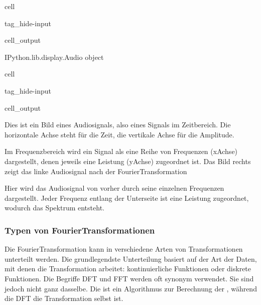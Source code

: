 \documentclass[letterpaper,10pt,english]{jupyterBook}
\begin{document}
\begin{sphinxuseclass}{cell}
\begin{sphinxuseclass}{tag_hide-input}\begin{sphinxVerbatimOutput}

\begin{sphinxuseclass}{cell_output}
\begin{sphinxVerbatim}[commandchars=\\\{\}]
\PYGZlt{}IPython.lib.display.Audio object\PYGZgt{}
\end{sphinxVerbatim}

\end{sphinxuseclass}\end{sphinxVerbatimOutput}

\end{sphinxuseclass}
\end{sphinxuseclass}
\begin{sphinxuseclass}{cell}
\begin{sphinxuseclass}{tag_hide-input}\begin{sphinxVerbatimOutput}

\begin{sphinxuseclass}{cell_output}
\noindent{}

\end{sphinxuseclass}\end{sphinxVerbatimOutput}

\end{sphinxuseclass}
\end{sphinxuseclass}
\sphinxAtStartPar
Dies ist ein Bild eines Audiosignals, also eines Signals im Zeitbereich. Die horizontale Achse steht für die Zeit, die vertikale Achse für die Amplitude.

\sphinxAtStartPar
Im Frequenzbereich wird ein Signal als eine Reihe von Frequenzen (x\sphinxhyphen{}Achse) dargestellt, denen jeweils eine Leistung (y\sphinxhyphen{}Achse) zugeordnet ist. Das Bild rechts zeigt das linke Audiosignal nach der Fourier\sphinxhyphen{}Transformation

\sphinxAtStartPar
Hier wird das Audiosignal von vorher durch seine einzelnen Frequenzen dargestellt. Jeder Frequenz entlang der Unterseite ist eine Leistung zugeordnet, wodurch das Spektrum entsteht.


\subsubsection{Typen von Fourier\sphinxhyphen{}Transformationen}
\label{\detokenize{content/3_FourierAnalyse:typen-von-fourier-transformationen}}
\sphinxAtStartPar
Die Fourier\sphinxhyphen{}Transformation kann in verschiedene Arten von Transformationen unterteilt werden. Die grundlegendste Unterteilung basiert auf der Art der Daten, mit denen die Transformation arbeitet: kontinuierliche Funktionen oder diskrete Funktionen.
Die Begriffe DFT und FFT werden oft synonym verwendet. Sie sind jedoch nicht ganz dasselbe. Die  ist ein Algorithmus zur Berechnung der , während die DFT die Transformation selbst ist.
\end{document}
